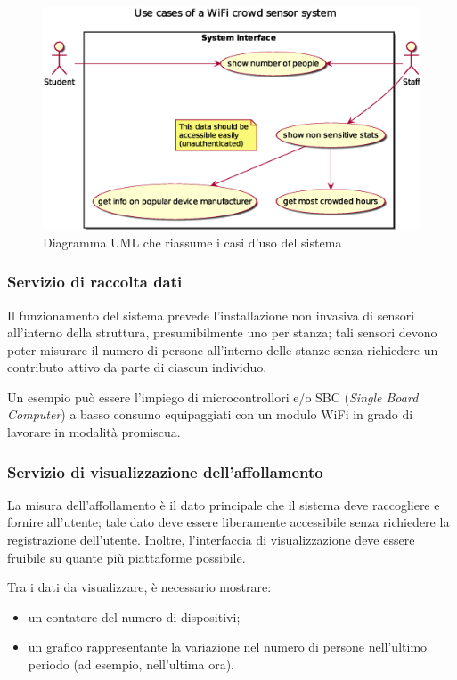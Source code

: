 \begin{figure}[H]
  \centering
  \includegraphics[width=\textwidth]{res/out/use-case.eps}
  \caption{Diagramma UML che riassume i casi d'uso del sistema}%
  \label{fig:use-cases}
\end{figure}

\subsubsection{Servizio di raccolta dati}

Il funzionamento del sistema prevede l'installazione non invasiva di sensori all'interno della struttura, presumibilmente uno per stanza;
tali sensori devono poter misurare il numero di persone all'interno delle stanze senza richiedere un contributo attivo da parte di ciascun individuo.

Un esempio può essere l'impiego di microcontrollori e/o SBC (\emph{Single Board Computer}) a basso consumo equipaggiati con un modulo WiFi in grado di lavorare in modalità promiscua.

\subsubsection{Servizio di visualizzazione dell'affollamento}

La misura dell'affollamento è il dato principale che il sistema deve raccogliere e fornire all'utente;
tale dato deve essere liberamente accessibile senza richiedere la registrazione dell'utente.
Inoltre, l'interfaccia di visualizzazione deve essere fruibile su quante più piattaforme possibile.

Tra i dati da visualizzare, è necessario mostrare:

\begin{itemize}
  \item un contatore del numero di dispositivi;
  \item un grafico rappresentante la variazione nel numero di persone nell'ultimo periodo (ad esempio, nell'ultima ora).
\end{itemize}

